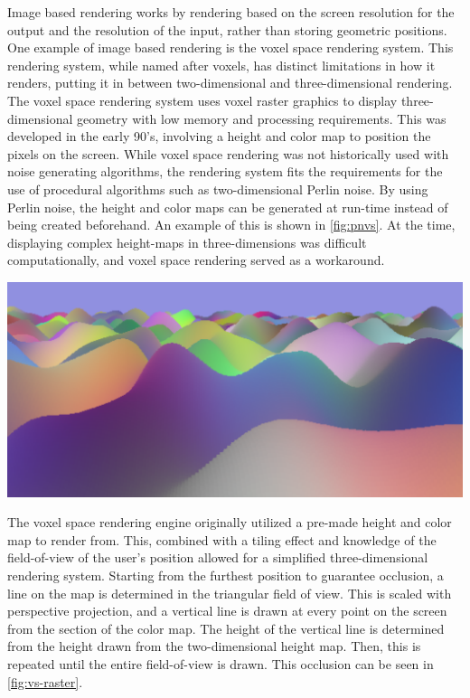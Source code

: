 \documentclass[10pt]{report}
\begin{document}
		Image based rendering works by rendering based on the screen resolution for the output and the resolution of the input, rather than storing geometric positions. One example of image based rendering is the voxel space rendering system. This rendering system, while named after voxels, has distinct limitations in how it renders, putting it in between two-dimensional and three-dimensional rendering. The voxel space rendering system uses voxel raster graphics to display three-dimensional geometry with low memory and processing requirements. This was developed in the early 90's, involving a height and color map to position the pixels on the screen. While voxel space rendering was not historically used with noise generating algorithms, the rendering system fits the requirements for the use of procedural algorithms such as two-dimensional Perlin noise. By using Perlin noise, the height and color maps can be generated at run-time instead of being created beforehand. An example of this is shown in \autoref{fig:pnvs}. At the time, displaying complex height-maps in three-dimensions was difficult computationally, and voxel space rendering served as a workaround. 
		
		\begin{minipage}{\textwidth}
			\centering
			\includegraphics[scale=.15]{proc-voxel}
			\label{fig:pnvs}
		\end{minipage}
		
		The voxel space rendering engine originally utilized a pre-made height and color map to render from. This, combined with a tiling effect and knowledge of the field-of-view of the user's position allowed for a simplified three-dimensional rendering system. Starting from the furthest position to guarantee occlusion, a line on the map is determined in the triangular field of view. This is scaled with perspective projection, and a vertical line is drawn at every point on the screen from the section of the color map. The height of the vertical line is determined from the height drawn from the two-dimensional height map. Then, this is repeated until the entire field-of-view is drawn. This occlusion can be seen in \autoref{fig:vs-raster}. 
		
\end{document}
